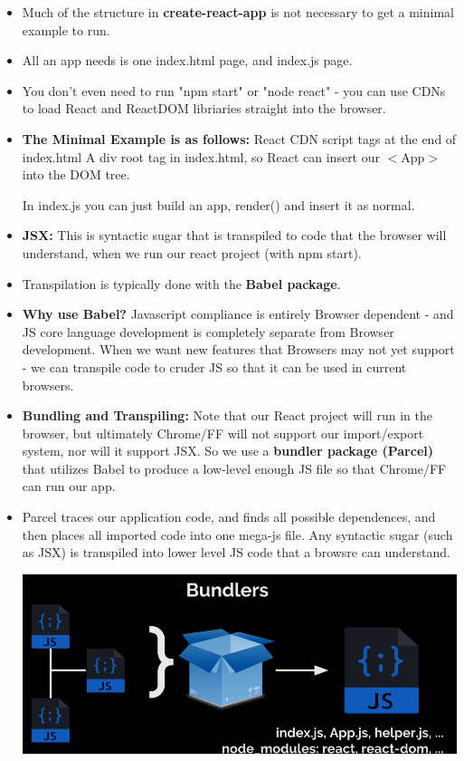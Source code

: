 \documentclass[8pt,a4paper]{extarticle}
\begin{document}
\begin{itemize}
\item Much of the structure in \textbf{create-react-app} is not necessary to get a minimal example to run.
\item All an app needs is one index.html page, and index.js page.
\item You don't even need to run "npm start" or "node react" - you can use CDNs to load React and ReactDOM libriaries straight into the browser.
\item \textbf{The Minimal Example is as follows:}
\mitem React CDN script tags at the end of index.html
\mitem A div root tag in index.html, so React can insert our $<$App$>$ into the DOM tree.

In index.js you can just build an app, render() and insert it as normal.
\item \textbf{JSX:} This is syntactic sugar that is transpiled to code that the browser will understand, when we run our react project (with npm start).
\item Transpilation is typically done with the \textbf{Babel package}.
\item \textbf{Why use Babel?} Javascript compliance is entirely Browser dependent - and JS core language development is completely separate from Browser development. When we want new features that Browsers may not yet support - we can transpile code to cruder JS so that it can be used in current browsers.

\item \textbf{Bundling and Transpiling:} Note that our React project will run in the browser, but ultimately Chrome/FF will not support our import/export system, nor will it support JSX. So we use a \textbf{bundler package (Parcel)} that utilizes Babel to produce a low-level enough JS file so that Chrome/FF can run our app. 
\item Parcel traces our application code, and finds all possible dependences, and then places all imported code into one mega-js file. Any syntactic sugar (such as JSX) is transpiled into lower level JS code that a browsre can understand.

\includegraphics[scale=0.24]{bundle.png}


\end{itemize}
\end{document}
